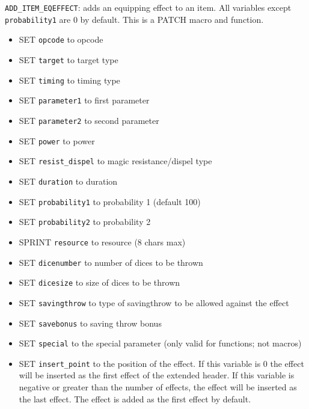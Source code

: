 \documentclass{article}
\begin{document}
\verb+ADD_ITEM_EQEFFECT+: adds an equipping effect to an item. All variables except \verb+probability1+ are 0 by default.
This is a PATCH macro and function.
\begin{itemize}
\item SET \verb+opcode+ to opcode
\item SET \verb+target+ to target type
\item SET \verb+timing+ to timing type
\item SET \verb+parameter1+ to first parameter
\item SET \verb+parameter2+ to second parameter
\item SET \verb+power+ to power
\item SET \verb+resist_dispel+ to magic resistance/dispel type
\item SET \verb+duration+ to duration
\item SET \verb+probability1+ to probability 1 (default 100)
\item SET \verb+probability2+ to probability 2
\item SPRINT \verb+resource+ to resource (8 chars max)
\item SET \verb+dicenumber+ to number of dices to be thrown
\item SET \verb+dicesize+ to size of dices to be thrown
\item SET \verb+savingthrow+ to type of savingthrow to be allowed against the effect
\item SET \verb+savebonus+ to saving throw bonus
\item SET \verb+special+ to the special parameter (only valid for functions; not macros)
\item SET \verb+insert_point+ to the position of the effect. If this variable is 0 the effect will be inserted as the first effect of the extended header. If this variable is negative or greater than the number of effects, the effect will be inserted as the last effect. The effect is added as the first effect by default.
\end{itemize}
\end{document}
